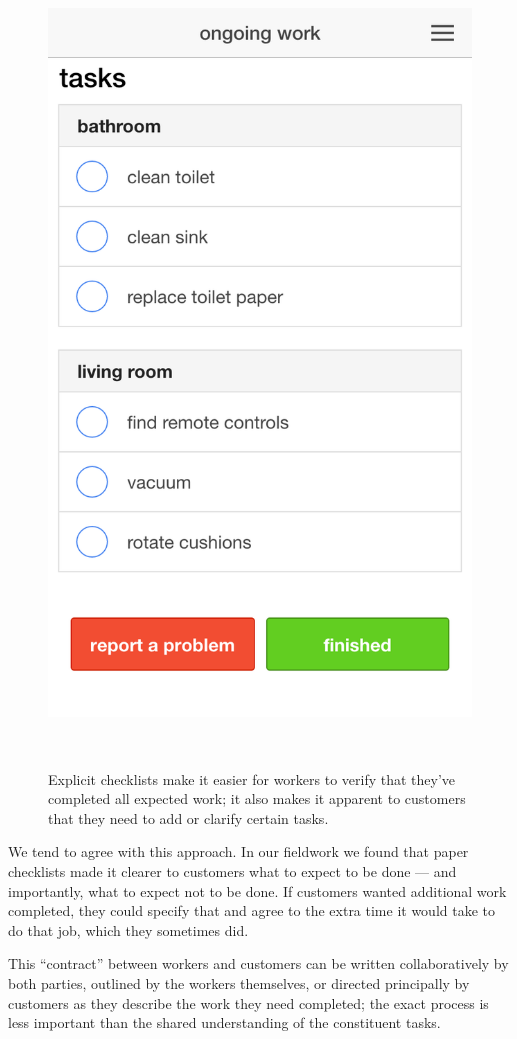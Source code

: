 \begin{figure}[t]
\centering
  \includegraphics[width=1\columnwidth]{figures/checklist}
    \caption{Explicit checklists make it easier for workers to verify that they've completed all expected work;
    it also makes it apparent to customers that they need to add or clarify certain tasks.}~\label{fig:checklist}
\end{figure}

We tend to agree with this approach.
In our fieldwork we found that paper checklists made it clearer to customers what to expect to be done
--- and importantly, what to expect not to be done.
If customers wanted additional work completed, they could specify that and agree to the extra time it would take to do that job, which they sometimes did.

This ``contract'' between workers and customers can be written collaboratively by both parties,
outlined by the workers themselves, or directed principally by customers as they describe the work they need completed;
the exact process is less important than the shared understanding of the constituent tasks.